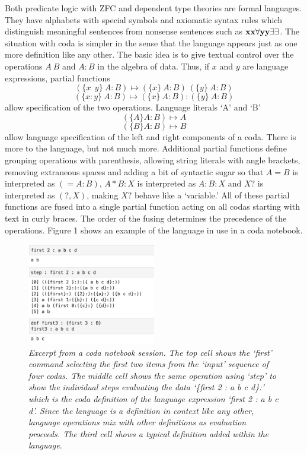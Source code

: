 \documentclass[11pt]{article}
\begin{document}
Both predicate logic with ZFC and dependent type theories are formal languages.  They have alphabets with special symbols 
and axiomatic syntax rules which distinguish meaningful sentences from nonsense sentences such as ${\bf xx\forall yy\exists\exists}$.  
The situation with coda is simpler in the sense that the language appears just as one more definition like any other.  
The basic idea is to give textual control over the operations $A\ B$ and $A:B$ in the algebra of data.
Thus, if $x$ and $y$ are language expressions, partial functions 
\begin{equation} \label{eqn} 
( \{x\ \ y\} \ A : B ) \mapsto (\{x\}\ A : B)\ (\{y\}\ A : B)
\end{equation} 
\begin{equation} \label{eqn} 
( \{x : y\} \ A : B ) \mapsto (\{x\}\ A : B):(\{y\}\ A : B) 
\end{equation} 
allow specification of the two operations.  Language literals `A' and `B' 
\begin{equation}\label{eqn}
(\{A\} A:B)\mapsto A
\end{equation}
\begin{equation}\label{eqn}
(\{B\} A:B)\mapsto B
\end{equation}
allow language specification of the left and right components of a coda.  There is more to the language, but not much more.  Additional partial functions 
define grouping operations with parenthesis, allowing string literals with angle brackets, removing extraneous spaces and adding a bit of syntactic 
sugar so that $A=B$ is interpreted as $(=A:B)$, $A*B:X$ is interpreted as $A:B:X$ and $X?$ is interpreted as $(?,X)$, making $X?$ behave like 
a `variable.'  All of these partial functions are fused into a single partial function acting on all codas starting with text in curly braces.  The order of 
the fusing determines the precedence of the operations.  Figure 1 shows an example of the language in use in a coda notebook\cite{github}. 
\begin{figure}[h]
\centering
\includegraphics[width=0.5\textwidth]{fig1.png}
\caption{{\it Excerpt from a coda notebook session.  The top cell shows the `first' command selecting the first two items from the `input' 
sequence of four codas.  The middle cell shows the same operation using `step' to  show the individual steps evaluating the 
data `\{first 2 : a b c d\}:' which is the coda definition of the language expression `first 2 : a b c d'.  Since the language is a definition 
in context like any other, language operations mix with other definitions as evaluation proceeds.  The third cell shows a typical definition added within the language.}}
\end{figure} 
\end{document}
